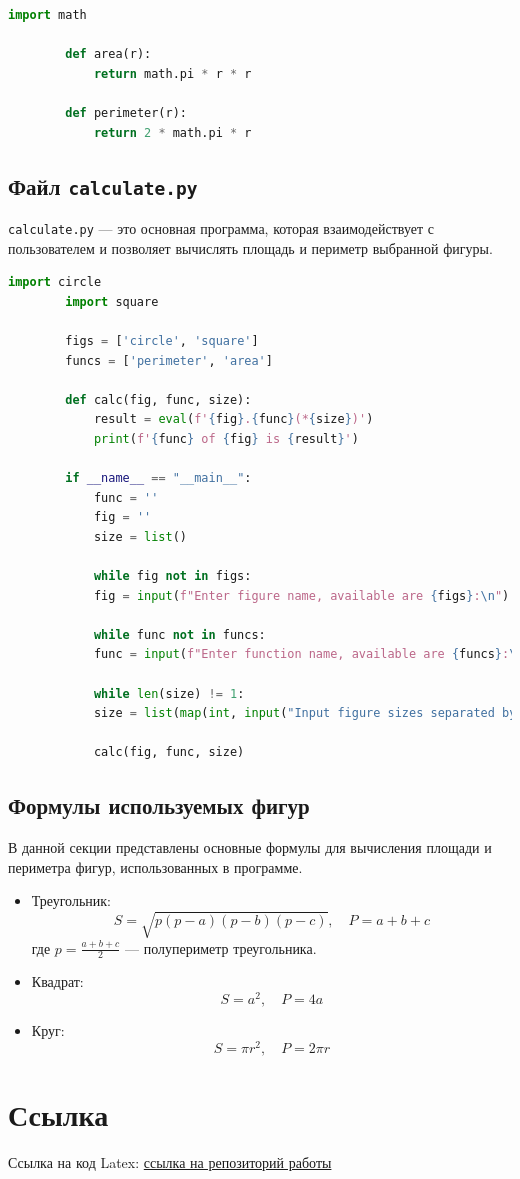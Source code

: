 \documentclass[a4paper, 14pt]{extarticle}
\begin{document}
	\begin{lstlisting}[language=Python]
		import math
		
		def area(r):
			return math.pi * r * r
		
		def perimeter(r):
			return 2 * math.pi * r
	\end{lstlisting}
	
	\newpage
	\subsection{Файл \texttt{calculate.py}}
	\texttt{calculate.py} — это основная программа, которая взаимодействует с пользователем и позволяет вычислять площадь и периметр выбранной фигуры.
	\begin{lstlisting}[language=Python]
		import circle
		import square
		
		figs = ['circle', 'square']
		funcs = ['perimeter', 'area']
		
		def calc(fig, func, size):
			result = eval(f'{fig}.{func}(*{size})')
			print(f'{func} of {fig} is {result}')
		
		if __name__ == "__main__": 
			func = ''
			fig = ''
			size = list()
			
			while fig not in figs:
			fig = input(f"Enter figure name, available are {figs}:\n")
			
			while func not in funcs:
			func = input(f"Enter function name, available are {funcs}:\n")
			
			while len(size) != 1:
			size = list(map(int, input("Input figure sizes separated by space, 1 for circle and square\n").split(' ')))
			
			calc(fig, func, size)
	\end{lstlisting}
	
	\newpage
	\subsection{Формулы используемых фигур}
	В данной секции представлены основные формулы для вычисления площади и периметра фигур, использованных в программе.
	
	\begin{itemize}
		\item Треугольник:
		\[
		S = \sqrt{p(p - a)(p - b)(p - c)}, \quad P = a + b + c
		\]
		где \(p = \frac{a + b + c}{2}\) — полупериметр треугольника.
		
		\item Квадрат:
		\[
		S = a^2, \quad P = 4a
		\]
		
		\item Круг:
		\[
		S = \pi r^2, \quad P = 2\pi r
		\]
	\end{itemize}
	
	\newpage
	\section{Ссылка}
	Ссылка на код Latex:
	\href{https://github.com/username/repository}{ссылка на репозиторий работы}
	
\end{document}
